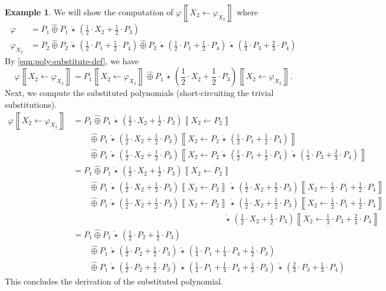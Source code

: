 \documentclass[10pt]{amsart}
\theoremstyle{plain}
\theoremstyle{definition}
\newtheorem{example}[lemma]{Example}
\providecommand{\cplus}[0]{\ensuremath{\hat{\oplus}}\xspace}
\providecommand{\cmult}[0]{\ensuremath{{\,\mathring{\star}\,}}\xspace}
\providecommand{\substitute}[2]{\ensuremath{\left\llbracket {#1} \gets {#2} \right\rrbracket}\xspace}
\begin{document}
\begin{example}
\label{eg:2}
We will show the computation of $\varphi\substitute{X_2}{\varphi_{X_2}}$ where
\begin{align*}
    \varphi &= P_1 \cplus P_1\cmult\left(\frac12\cdot X_2 + \frac12\cdot P_3\right) \\ 
    \varphi_{X_2} &= P_2 \cplus P_2\cmult\left(\frac12\cdot P_1 + \frac12\cdot P_4\right) \cplus P_2\cmult\left(\frac12\cdot P_1 + \frac12\cdot P_4\right)\cmult\left(\frac13\cdot P_3+\frac23\cdot P_4\right)
\end{align*}
By \eqref{eqn:poly-substitute-def}, we have 
    $$\varphi\substitute{X_2}{\varphi_{X_2}} = P_1\substitute{X_2}{\varphi_{X_2}} \cplus P_1\cmult \left(\frac12\cdot X_2  + \frac12\cdot P_3\right)\substitute{X_2}{\varphi_{X_2}}.$$
Next, we compute the substituted polynomials (short-circuiting the trivial substitutions).
{
\begin{align*}
    \varphi\substitute{X_2}{\varphi_{X_2}} &= P_1 \cplus P_1\cmult \left(\frac12\cdot X_2  + \frac12\cdot P_3\right)\substitute{X_2}{P_2} \\
    &\qquad \cplus P_1\cmult \left(\frac12\cdot X_2  + \frac12\cdot P_3\right)\substitute{X_2}{P_2\cmult\left(\frac12\cdot P_1 + \frac12\cdot P_4\right)} \\
    &\qquad \cplus P_1\cmult \left(\frac12\cdot X_2  + \frac12\cdot P_3\right)\substitute{X_2}{P_2\cmult\left(\frac12\cdot P_1 + \frac12\cdot P_4\right)\cmult\left(\frac13\cdot P_3+\frac23\cdot P_4\right)} \\
    &= P_1 \cplus P_1\cmult \left(\frac12\cdot X_2  + \frac12\cdot P_3\right)\substitute{X_2}{P_2} \\
    &\qquad \cplus P_1\cmult \left(\frac12\cdot X_2  + \frac12\cdot P_3\right)\substitute{X_2}{P_2}\cmult \left(\frac12\cdot X_2  + \frac12\cdot P_3\right)\substitute{X_2}{\frac12\cdot P_1 + \frac12\cdot P_4} \\
    &\qquad \cplus P_1\cmult \left(\frac12\cdot X_2  + \frac12\cdot P_3\right)\substitute{X_2}{P_2} \cmult \left(\frac12\cdot X_2  + \frac12\cdot P_3\right)\substitute{X_2}{\frac12\cdot P_1 + \frac12\cdot P_4} \\
    &\qquad\qquad\qquad\qquad\qquad\qquad\qquad\qquad\qquad\ \cmult \left(\frac12\cdot X_2  + \frac12\cdot P_3\right)\substitute{X_2}{\frac13\cdot P_3+\frac23\cdot P_4}\\
    &= P_1 \cplus P_1\cmult \left(\frac12\cdot P_2  + \frac12\cdot P_3\right) \\
    &\qquad \cplus P_1\cmult \left(\frac12\cdot P_2  + \frac12\cdot P_3\right) \cmult \left(\frac14\cdot P_1 + \frac14\cdot P_4 + \frac12\cdot P_3\right) \\
    &\qquad \cplus P_1\cmult \left(\frac12\cdot P_2  + \frac12\cdot P_3\right) \cmult \left(\frac14\cdot P_1 + \frac14\cdot P_4 + \frac12\cdot P_3\right) \cmult \left(\frac23\cdot P_3 + \frac13\cdot P_4\right)
\end{align*}
}
This concludes the derivation of the substituted polynomial. 
\end{example}
\end{document}
